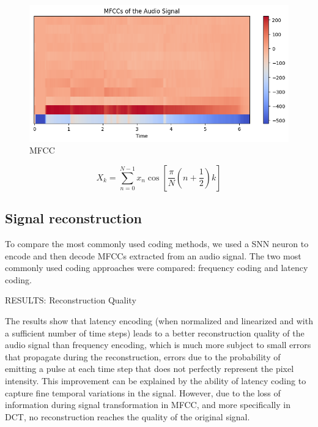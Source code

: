 \documentclass[11pt]{article}
\begin{document}
\begin{figure}[h]
  \centering
  \begin{minipage}{0.75\textwidth}
    \centering
    \includegraphics[width=1\textwidth]{"image/MFCC_piano.png"}
    \caption{MFCC}
    \label{fig:MFCC_piano}
  \end{minipage}\hfill
\end{figure}



\begin{equation}
  X_k = \sum_{n=0}^{N-1} x_n \cos \left[ \frac{\pi}{N} \left( n + \frac{1}{2} \right) k \right]
  \label{eq:dct}
\end{equation}



\subsection{Signal reconstruction}

To compare the most commonly used coding methods, we used a SNN neuron to encode and then decode MFCCs extracted from an audio signal. The two most commonly used coding approaches were compared: frequency coding and latency coding.

RESULTS: Reconstruction Quality

The results show that latency encoding (when normalized and linearized and with a sufficient number of time steps) leads to a better reconstruction quality of the audio signal than frequency encoding, which is much more subject to small errors that propagate during the reconstruction, errors due to the probability of emitting a pulse at each time step that does not perfectly represent the pixel intensity. This improvement can be explained by the ability of latency coding to capture fine temporal variations in the signal. However, due to the loss of information during signal transformation in MFCC, and more specifically in DCT, no reconstruction reaches the quality of the original signal.
\end{document}
